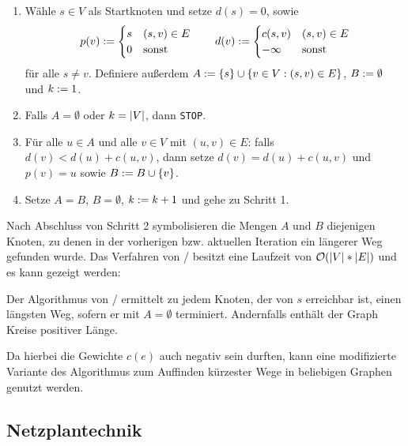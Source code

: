 \begin{enumerate}[label=Schritt \arabic*:, leftmargin=*, start=0]
	\item Wähle $s \in V$ als Startknoten und setze $d(s) = 0$, sowie
	\begin{equation*}
		p(v) \mathrel{:=} \begin{cases}
		s & (s,v) \in E \\ 0 & \text{sonst}
		\end{cases} 
		\qquad
		d(v) \mathrel{:=} \begin{cases}
		c(s,v) & (s,v) \in E \\ -\infty &\text{sonst}
		\end{cases}
	\end{equation*}
	für alle $s \neq v$. Definiere außerdem $A \mathrel{:=} \left\{ s \right\} \cup \left\{ v \in V: (s,v) \in E \right\}$, $B \mathrel{:=} \emptyset$ und $k \mathrel{:=} 1$.
	\item Falls $A = \emptyset$ oder $k = \left| V \right|$, dann \texttt{STOP}.
	\item Für alle $u \in A$ und alle $v \in V$ mit $(u,v) \in E$: falls $d(v) < d(u) + c(u,v)$, dann setze $d(v) = d(u) + c(u,v)$ und $p(v) = u$ sowie $B \mathrel{:=} B \cup \left\{ v \right\}$.
	\item Setze $A = B$, $B = \emptyset$, $k \mathrel{:=} k+1$ und gehe zu Schritt 1.
\end{enumerate}

Nach Abschluss von Schritt 2 symbolisieren die Mengen $A$ und $B$ diejenigen Knoten, zu denen in der vorherigen bzw. aktuellen Iteration ein längerer Weg gefunden wurde. Das Verfahren von / besitzt eine Laufzeit von $\mathcal{O}(\left| V \right| * \left| E \right|)$ und es kann gezeigt werden:

\begin{aussage}
	Der Algorithmus von / ermittelt zu jedem Knoten, der von $s$ erreichbar ist, einen längsten Weg, sofern er mit $A = \emptyset$ terminiert. Andernfalls enthält der Graph Kreise positiver Länge.
\end{aussage}


Da hierbei die Gewichte $c(e)$ auch negativ sein durften, kann eine modifizierte Variante des Algorithmus zum Auffinden kürzester Wege in beliebigen Graphen genutzt werden.

\subsection{Netzplantechnik}

